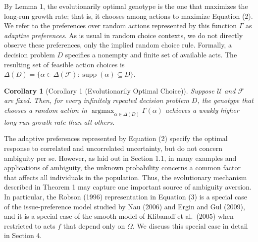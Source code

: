 \documentclass[12pt,a4paper]{article}
\newenvironment{original}
  {\par\noindent\color{black}\smallskip}
  {\par\smallskip}
\newtheorem{corollary}[theorem]{Corollary}
\begin{document}
\begin{original}
By Lemma 1, the evolutionarily optimal genotype is the one that maximizes the long-run growth rate; that is, it chooses among actions to maximize Equation (2). We refer to the preferences over random actions represented by this function $\Gamma$ as \emph{adaptive preferences}. As is usual in random choice contexts, we do not directly observe these preferences, only the implied random choice rule. Formally, a decision problem $D$ specifies a nonempty and finite set of available acts. The resulting set of feasible action choices is $\Delta(D) = \{\alpha \in \Delta(\mathcal{F}) : \operatorname{supp}(\alpha) \subseteq D\}$.

\begin{corollary}[Corollary 1 (Evolutionarily Optimal Choice)]
Suppose $\mathcal{U}$ and $\mathcal{F}$ are fixed. Then, for every infinitely repeated decision problem $D$, the genotype that chooses a random action in $\operatorname{argmax}_{\alpha \in \Delta(D)} \Gamma(\alpha)$ achieves a weakly higher long-run growth rate than all others.
\end{corollary}

The adaptive preferences represented by Equation (2) specify the optimal response to correlated and uncorrelated uncertainty, but do not concern ambiguity per se. However, as laid out in Section 1.1, in many examples and applications of ambiguity, the unknown probability concerns a common factor that affects all individuals in the population. Thus, the evolutionary mechanism described in Theorem 1 may capture one important source of ambiguity aversion. In particular, the Robson (1996) representation in Equation (3) is a special case of the issue-preference model studied by Nau (2006) and Ergin and Gul (2009), and it is a special case of the smooth model of Klibanoff et al.\ (2005) when restricted to acts $f$ that depend only on $\Omega$. We discuss this special case in detail in Section 4.
\end{original}
\end{document}

